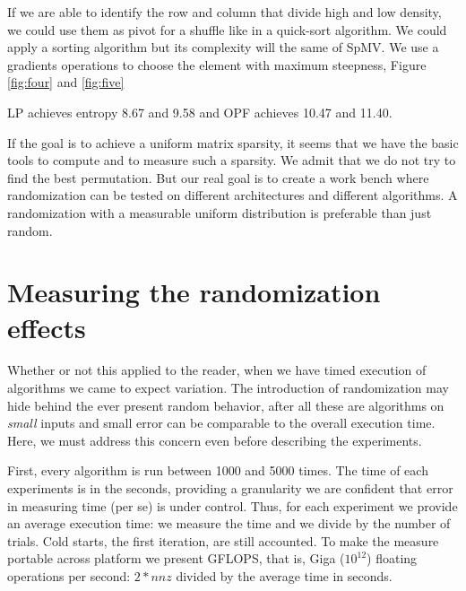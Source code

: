 \documentclass[manuscript,screen]{acmart}
\begin{document}
If we are able to identify the row and column that divide high and low
density, we could use them as pivot for a shuffle like in a quick-sort
algorithm. We could apply a sorting algorithm but its complexity will
the same of SpMV. We use a gradients operations to choose the element
with maximum steepness, Figure \ref{fig:four} and \ref{fig:five}

LP achieves entropy 8.67 and 9.58 and OPF achieves 10.47 and 11.40.



If the goal is to achieve a uniform matrix sparsity, it seems that we
have the basic tools to compute and to measure such a sparsity. We
admit that we do not try to find the best permutation. But our real
goal is to create a work bench where randomization can be tested on
different architectures and different algorithms. A randomization with
a measurable uniform distribution is preferable than just random.

\section{Measuring the randomization effects}
\label{sec:measuring}

Whether or not this applied to the reader, when we have timed
execution of algorithms we came to expect variation.  The introduction
of randomization may hide behind the ever present random behavior,
after all these are algorithms on {\em small} inputs and small error
can be comparable to the overall execution time. Here, we must address
this concern even before describing the experiments.

First, every algorithm is run between 1000 and 5000 times. The time of
each experiments is in the seconds, providing a granularity we are
confident that error in measuring time (per se) is under
control. Thus, for each experiment we provide an average execution
time: we measure the time and we divide by the number of trials. Cold
starts, the first iteration, are still accounted. To make the measure
portable across platform we present GFLOPS, that is, Giga ($10^{12}$)
floating operations per second: $2*nnz$ divided by the average time in
seconds.
\end{document}
